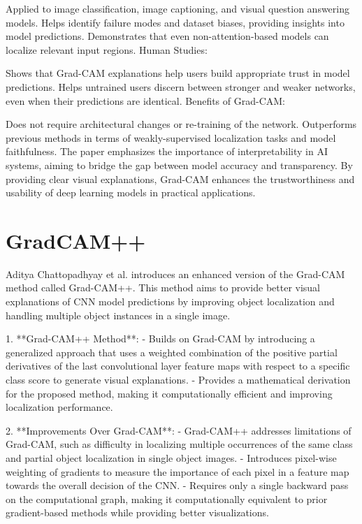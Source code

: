 Applied to image classification, image captioning, and visual question answering models.
Helps identify failure modes and dataset biases, providing insights into model predictions.
Demonstrates that even non-attention-based models can localize relevant input regions.
Human Studies:

Shows that Grad-CAM explanations help users build appropriate trust in model predictions.
Helps untrained users discern between stronger and weaker networks, even when their predictions are identical.
Benefits of Grad-CAM:

Does not require architectural changes or re-training of the network.
Outperforms previous methods in terms of weakly-supervised localization tasks and model faithfulness.
The paper emphasizes the importance of interpretability in AI systems, aiming to bridge the gap between model accuracy and transparency. By providing clear visual explanations, Grad-CAM enhances the trustworthiness and usability of deep learning models in practical applications.

\section{GradCAM++}
Aditya Chattopadhyay et al. introduces an enhanced version of the Grad-CAM method called Grad-CAM++. This method aims to provide better visual explanations of CNN model predictions by improving object localization and handling multiple object instances in a single image.

1. **Grad-CAM++ Method**:
   - Builds on Grad-CAM by introducing a generalized approach that uses a weighted combination of the positive partial derivatives of the last convolutional layer feature maps with respect to a specific class score to generate visual explanations.
   - Provides a mathematical derivation for the proposed method, making it computationally efficient and improving localization performance.

2. **Improvements Over Grad-CAM**:
   - Grad-CAM++ addresses limitations of Grad-CAM, such as difficulty in localizing multiple occurrences of the same class and partial object localization in single object images.
   - Introduces pixel-wise weighting of gradients to measure the importance of each pixel in a feature map towards the overall decision of the CNN.
   - Requires only a single backward pass on the computational graph, making it computationally equivalent to prior gradient-based methods while providing better visualizations.

